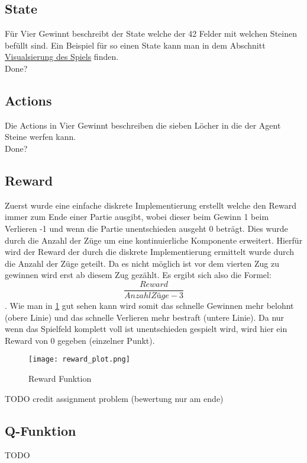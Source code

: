 \subsection{State}
 Für Vier Gewinnt beschreibt der State welche der 42 Felder mit welchen Steinen befüllt sind. Ein Beispiel für so einen State kann man in dem Abschnitt \hyperref[sec:visualisierung]{Visualsierung des Spiels} finden.\\
\colorbox{red!30}{Done?}

\subsection{Actions}
Die Actions in Vier Gewinnt beschreiben die sieben Löcher in die der Agent Steine werfen kann.\\
\colorbox{red!30}{Done?} 

\subsection{Reward}
 Zuerst wurde eine einfache diskrete Implementierung erstellt welche den Reward immer zum Ende einer Partie ausgibt, wobei dieser beim Gewinn 1 beim Verlieren -1 und wenn die Partie unentschieden ausgeht 0 beträgt.
Dies wurde durch die Anzahl der Züge um eine kontinuierliche Komponente erweitert. Hierfür wird der Reward der durch die diskrete Implementierung ermittelt wurde durch die Anzahl der Züge geteilt. Da es nicht möglich ist vor dem vierten Zug zu gewinnen wird erst ab diesem Zug gezählt. Es ergibt sich also die Formel: $$\frac{Reward}{Anzahl Züge-3}$$.
Wie man in \ref{fig:reward_function} gut sehen kann wird somit das schnelle Gewinnen mehr belohnt (obere Linie) und das schnelle Verlieren mehr bestraft (untere Linie). Da nur wenn das Spielfeld komplett voll ist unentschieden gespielt wird, wird hier ein Reward von 0 gegeben (einzelner Punkt). \\

\begin{figure}[h!]
  \texttt{[image: reward\_plot.png]}
  \centering
  \caption{Reward Funktion}
  \label{fig:reward_function}
\end{figure}

\colorbox{red!30}{TODO credit assignment problem (bewertung nur am ende)}\\

\subsection{Q-Funktion}
\colorbox{red!30}{TODO} %

